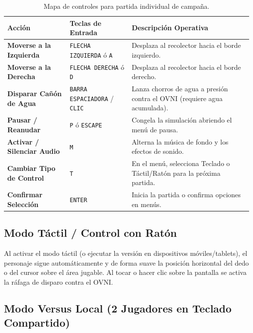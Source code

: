 \documentclass[11pt,a4paper]{article}
\begin{document}
\begin{table}[h!]
\centering
\begin{tcolorbox}[enhanced, colback=white, colframe=CyanGlow, arc=3mm, boxrule=1pt, width=\textwidth, left=6pt, right=6pt, top=6pt, bottom=6pt]
\begin{tabularx}{\textwidth}{p{3.8cm}p{4.2cm}X}
\toprule
\textbf{Acción} & \textbf{Teclas de Entrada} & \textbf{Descripción Operativa} \\
\midrule
\textbf{Moverse a la Izquierda} & \texttt{FLECHA IZQUIERDA} ó \texttt{A} & Desplaza al recolector hacia el borde izquierdo. \\
\textbf{Moverse a la Derecha} & \texttt{FLECHA DERECHA} ó \texttt{D} & Desplaza al recolector hacia el borde derecho. \\
\textbf{Disparar Cañón de Agua} & \texttt{BARRA ESPACIADORA} / \texttt{CLIC} & Lanza chorros de agua a presión contra el OVNI (requiere agua acumulada). \\
\textbf{Pausar / Reanudar} & \texttt{P} ó \texttt{ESCAPE} & Congela la simulación abriendo el menú de pausa. \\
\textbf{Activar / Silenciar Audio} & \texttt{M} & Alterna la música de fondo y los efectos de sonido. \\
\textbf{Cambiar Tipo de Control} & \texttt{T} & En el menú, selecciona Teclado o Táctil/Ratón para la próxima partida. \\
\textbf{Confirmar Selección} & \texttt{ENTER} & Inicia la partida o confirma opciones en menús. \\
\bottomrule
\end{tabularx}
\end{tcolorbox}
\caption{Mapa de controles para partida individual de campaña.}
\end{table}

\subsection*{Modo Táctil / Control con Ratón}
Al activar el modo táctil (o ejecutar la versión en dispositivos móviles/tablets), el personaje sigue automáticamente y de forma suave la posición horizontal del dedo o del cursor sobre el área jugable. Al tocar o hacer clic sobre la pantalla se activa la ráfaga de disparo contra el OVNI.

\subsection*{Modo Versus Local (2 Jugadores en Teclado Compartido)}
\end{document}

